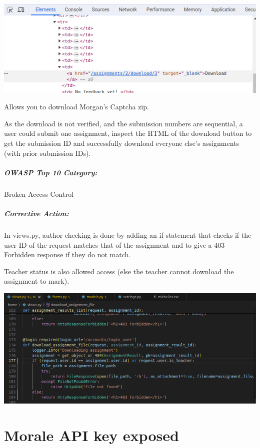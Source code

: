 \begin{center}
    \includegraphics[width = \linewidth]{images/Michelle/altdownload.png}
\end{center}

Allows you to download Morgan's Captcha zip.

As the download is not verified, and the submission numbers are sequential, a user could submit one assignment, inspect the HTML of the download button to get the submission ID and successfully download everyone else's assignments (with prior submission IDs).

\subparagraph{OWASP Top 10 Category:}

Broken Access Control

\subparagraph{Corrective Action:}

In views.py, author checking is done by adding an if statement that checks if the user ID of the request matches that of the assignment and to give a 403 Forbidden response if they do not match.

Teacher status is also allowed access (else the teacher cannot download the assignment to mark).

\begin{center}
    \includegraphics[width = \linewidth]{images/Michelle/assignmentgetfix.png}
\end{center}

\section{Morale API key exposed}

